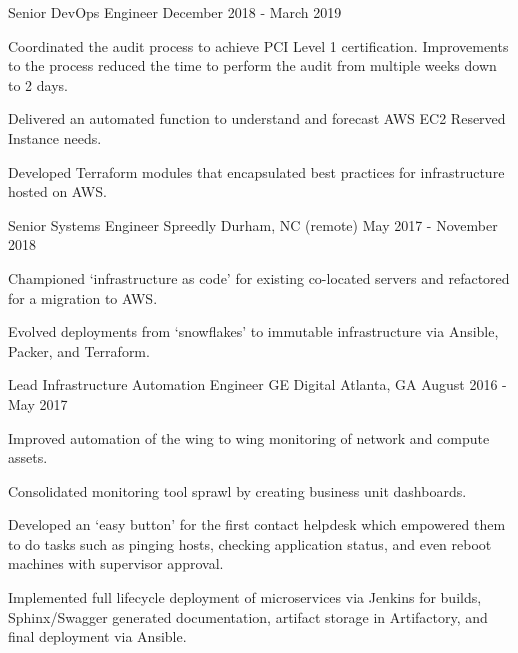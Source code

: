 \begin{cventries}
  \cventry
    {Senior DevOps Engineer} %
    {} %
    {} %
    {December 2018 - March 2019} %
    { 
      \begin{cvitems} %
        \item {Coordinated the audit process to achieve PCI Level 1 certification. Improvements to the process reduced the time to perform the audit from multiple weeks down to 2 days.}
        \item {Delivered an automated function to understand and forecast AWS EC2 Reserved Instance needs.}
        \item {Developed Terraform modules that encapsulated best practices for infrastructure hosted on AWS.}
      \end{cvitems}
    }

  \cventry
    {Senior Systems Engineer} %
    {Spreedly} %
    {Durham, NC (remote)} %
    {May 2017 - November 2018} %
    {
      \begin{cvitems} %
        \item {Championed `infrastructure as code' for existing co-located servers and refactored for a migration to AWS.}
        \item {Evolved deployments from `snowflakes' to immutable infrastructure via Ansible, Packer, and Terraform.}
      \end{cvitems}
    }

  \cventry
    {Lead Infrastructure Automation Engineer} %
    {GE Digital} %
    {Atlanta, GA} %
    {August 2016 - May 2017} %
    {
      \begin{cvitems} %
        \item {Improved automation of the wing to wing monitoring of network and compute assets.}
        \item {Consolidated monitoring tool sprawl by creating business unit dashboards.}
        \item {Developed an `easy button' for the first contact helpdesk which empowered them to do tasks such as pinging hosts, checking application status, and even reboot machines with supervisor approval.}
        \item {Implemented full lifecycle deployment of microservices via Jenkins for builds, Sphinx/Swagger generated documentation, artifact storage in Artifactory, and final deployment via Ansible.}
      \end{cvitems}
    }


\end{cventries}
